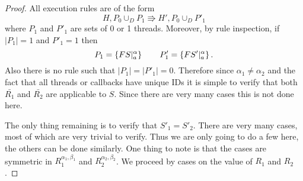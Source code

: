 \begin{proof}
  All execution rules are of the form
  \begin{equation*}
    H, P_0 \cup_D P_1 \Rrightarrow H', P_0 \cup_D P'_1
  \end{equation*}
  where $P_1$ and $P'_1$ are sets of 0 or 1 threads. Moreover, by rule
  inspection, if $|P_1| = 1$ and $P'_1 = 1$ then
  \begin{equation*}
    P_1 =  \left\{ FS|_a^\alpha \right\} \quad\quad P'_1 = \left\{ FS'|_a^\alpha
    \right\}.
  \end{equation*}
  Also there is no rule such that $|P_1| = |P'_1| = 0$.
  Therefore since $\alpha_1 \neq \alpha_2$ and the fact that all threads or
  callbacks have unique IDs it is simple to verify that both $\bar{R_1}$ and
  $\bar{R_2}$ are applicable to $S$. Since there are very many cases this is not
  done here.

  The only thing remaining is to verify that $S'_1 = S'_2$. There are very many
  cases, most of which are very trivial to verify. Thus we are only going to do
  a few here, the others can be done similarly. One thing to note is that the
  cases are symmetric in $R_1^{\alpha_1, \beta_1}$ and $R_2^{\alpha_2,
  \beta_2}$. We proceed by cases on the value of $R_1$ and $R_2$.


\end{proof}
